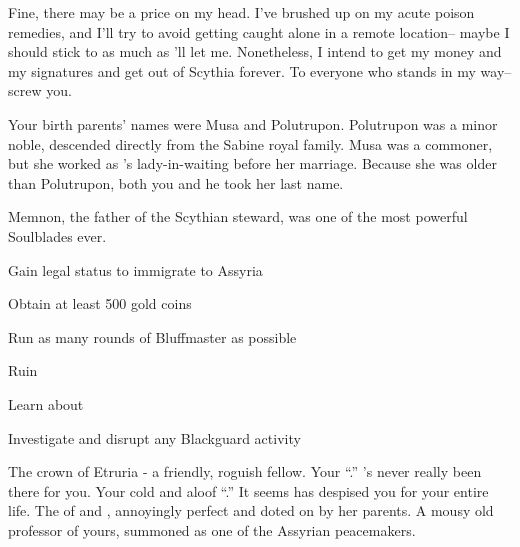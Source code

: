 \documentclass[char]{Kos}
\begin{document}
Fine, there may be a price on my head. I've brushed up on my acute poison remedies, and I'll try to avoid getting caught alone in a remote location-- maybe I should stick to \cPoet{} as much as \cPoet{\they}'ll let me. Nonetheless, I intend to get my money and my signatures and get out of Scythia forever. To everyone who stands in my way-- screw you.

\begin{itemz}[Notes]
  \item Your birth parents' names were Musa and Polutrupon. Polutrupon was a minor noble, descended directly from the Sabine royal family. Musa was a commoner, but she worked as \cScythiaQueen{}'s lady-in-waiting before her marriage. Because she was older than Polutrupon, both you and he took her last name.
  \item Memnon, the father of the Scythian steward, was one of the most powerful Soulblades ever.
\end{itemz}

\begin{itemz}[Goals]
\item Gain legal status to immigrate to Assyria
\item Obtain at least 500 gold coins
\item Run as many rounds of Bluffmaster as possible
\item Ruin \cBride{}
\item Learn about \cAnarchist{}
\item Investigate and disrupt any Blackguard activity
\end{itemz}

\begin{contacts}
\contact{\cPoet{}} The crown \cPoet{\prince} of Etruria - a friendly, roguish fellow.
\contact{\cScythiaKing{}} Your ``\cScythiaKing{\parent}.'' \cScythiaKing{\They}'s never really been there for you.
\contact{\cScythiaQueen{}} Your cold and aloof ``\cScythiaQueen{\parent}.'' It seems \cScythiaQueen{\they} has despised you for your entire life.
\contact{\cBride{}} The \cBride{\offspring} of \cScythiaKing{} and \cScythiaQueen{}, annoyingly perfect and doted on by her parents.
\contact{\cAnarchist{}} A mousy old professor of yours, summoned as one of the Assyrian peacemakers.
\end{contacts}
\end{document}
